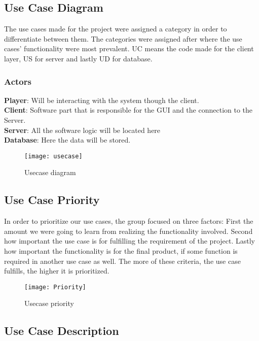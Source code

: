 \subsection{Use Case Diagram}

The use cases made for the project were assigned a category in order to
 differentiate between them. The categories were assigned after where the
  use cases’ functionality were most prevalent. UC means the code made for
   the client layer, US for server and lastly UD for database.

\subsubsection{Actors}

\textbf{Player}: Will be interacting with the system though the client.\\
\textbf{Client}: Software part that is responsible for the GUI and the connection
 to the Server. \\
\textbf{Server}: All the software logic will be located here\\
\textbf{Database}: Here the data will be stored.

\begin{figure}[h]
\centering
\texttt{[image: usecase]}
\caption{Usecase diagram}
\end{figure}
\clearpage

\subsection{Use Case Priority}

In order to prioritize our use cases, the group focused on three factors:
 First the amount we were going to learn from realizing the functionality
  involved. Second how important the use case is for fulfilling the
   requirement of the project. Lastly how important the functionality
    is for the final product, if some function is required in another
     use case as well. The more of these criteria, the use case fulfills,
      the higher it is prioritized.

\begin{figure}[h]
\centering
\texttt{[image: Priority]}
\caption{Usecase priority}
\end{figure}

\subsection{Use Case Description}

